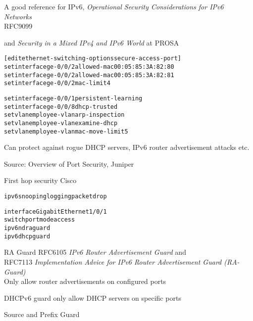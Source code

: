 \documentclass[Screen16to9,17pt]{foils}
\begin{document}
A good reference for IPv6, \emph{Operational Security Considerations for IPv6 Networks}\\ RFC9099 

and \emph{Security in a Mixed IPv4 and IPv6 World} at PROSA\\


\begin{alltt}\small
[edit ethernet-switching-options secure-access-port]
set interface ge-0/0/2 allowed-mac 00:05:85:3A:82:80
set interface ge-0/0/2 allowed-mac 00:05:85:3A:82:81
set interface ge-0/0/2 mac-limit 4

set interface ge-0/0/1 persistent-learning
set interface ge-0/0/8 dhcp-trusted
set vlan employee-vlan arp-inspection
set vlan employee-vlan examine-dhcp
set vlan employee-vlan mac-move-limit 5
\end{alltt}

Can protect against rogue DHCP servers, IPv6 router advertisement attacks etc.

Source: Overview of Port Security, Juniper\\ {\small{}}



First hop security Cisco
\begin{alltt}\small
ipv6 snooping logging packet drop

interface GigabitEthernet1/0/1
    switchport mode access
    ipv6 nd raguard
    ipv6 dhcp guard
\end{alltt}

\begin{list2}
\item RA Guard RFC6105 \emph{IPv6 Router Advertisement Guard} and \\
RFC7113 \emph{Implementation Advice for IPv6 Router Advertisement Guard (RA-Guard)}\\
Only allow router advertisements on configured ports
\item DHCPv6 guard only allow DHCP servers on specific ports
\item Source and Prefix Guard
\end{list2}
\end{document}
